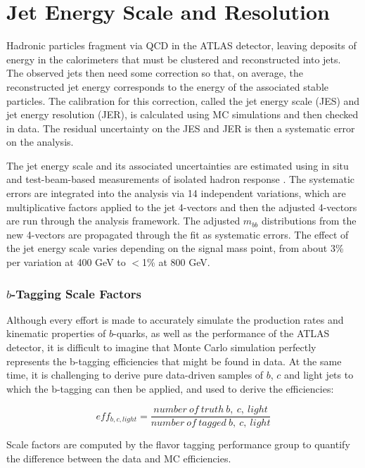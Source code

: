 \section{Jet Energy Scale and Resolution}
\label{sec:jes}
Hadronic particles fragment via QCD in the ATLAS detector, leaving deposits of 
energy in the calorimeters that must be clustered and reconstructed into jets.  The
observed jets then need some correction so that, on average, the reconstructed
jet energy corresponds to the energy of the associated stable particles.  The
calibration for this correction, called the jet energy scale (JES) and jet
energy resolution (JER), is calculated using MC simulations and then checked
in data.  The residual uncertainty on the JES and JER is then a systematic 
error on the analysis. 

The jet energy scale and its associated uncertainties are estimated using
in situ and test-beam-based measurements of isolated hadron response \cite{jes}.  The systematic
errors are integrated into the analysis via 14 independent variations, which are multiplicative factors applied to the jet
4-vectors and then the adjusted 4-vectors are run through the analysis framework.
The adjusted $m_{bb}$ distributions from the new 4-vectors are propagated through the fit as systematic
errors.  The effect of the jet energy scale varies depending on the signal mass
point, from about 3\% per variation at 400 GeV to $<$1\% at 800 GeV.


%

\subsubsection{$b$-Tagging Scale Factors}
\label{sec:SF}
Although every effort is made to accurately simulate the production rates and
kinematic properties of $b$-quarks, as well as the performance of the ATLAS
detector, it is difficult to imagine that Monte Carlo simulation perfectly represents
the b-tagging efficiencies that might be found in data.  At the same time, it
is challenging to derive pure data-driven samples of $b$, $c$ and light jets to which
the b-tagging can then be applied, and used to derive the efficiencies:

    \begin{equation}
        eff_{b,c,light}=\frac{number\ of\ truth\ b,\ c,\ light}{number\ of\ tagged\ b,\ c,\ light}
    \end{equation}

Scale factors are computed by the flavor tagging performance group to quantify the
difference between the data and MC efficiencies.


